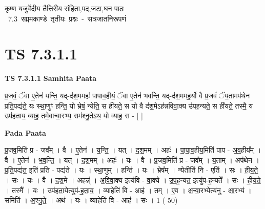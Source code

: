 \documentclass[17pt]{extarticle}
\begin{document}
\begin{titlepage}
    \begin{center}
 
\begin{sanskrit}
    { \Huge
    कृष्ण यजुर्वेदीय तैत्तिरीय संहिता,पद,जटा,घन पाठः 
    }
    \\
    \vspace{2.5cm}
    \mbox{ \Huge
    7.3      सप्तमकाण्डे तृतीयः प्रश्नः - सत्रजातनिरूपणं   }
\end{sanskrit}
\end{center}

\end{titlepage}
\tableofcontents
\pagebreak

\section*{ TS 7.3.1.1 }

\textbf{TS 7.3.1.1 } \newline
\textbf{Samhita Paata} \newline

प्र॒जवं॒ ॅवा ए॒तेन॑ यन्ति॒ यद्-द॑श॒ममहः॑ पापाव॒हीयं॒ ॅवा ए॒तेन॑ भवन्ति॒ यद्-द॑श॒ममह॒र्यो वै प्र॒जवं॑ ॅय॒तामप॑थेन प्रति॒पद्य॑ते॒ यः स्था॒णुꣳ हन्ति॒ यो भ्रेषं॒ न्येति॒ स ही॑यते॒ स यो वै द॑श॒मेऽह॑न्नविवा॒क्य उ॑पह॒न्यते॒ स ही॑यते॒ तस्मै॒ य उप॑हताय॒ व्याह॒ तमे॒वान्वा॒रभ्य॒ सम॑श्नु॒तेऽथ॒ यो व्याह॒ स - [  ] \newline

\textbf{Pada Paata} \newline

प्र॒जव॒मिति॑ प्र - जव᳚म् । वै । ए॒तेन॑ । य॒न्ति॒ । यत् । द॒श॒मम् । अहः॑ । पा॒पा॒व॒हीय॒मिति॑ पाप - अ॒व॒हीय᳚म् । वै । ए॒तेन॑ । भ॒व॒न्ति॒ । यत् । द॒श॒मम् । अहः॑ । यः । वै । प्र॒जव॒मिति॑ प्र - जव᳚म् । य॒ताम् । अप॑थेन । प्र॒ति॒पद्य॑त॒ इति॑ प्रति - पद्य॑ते । यः । स्था॒णुम् । हन्ति॑ । यः । भ्रेष᳚म् । न्येतीति॑ नि - एति॑ । सः । ही॒य॒ते॒ । सः । यः । वै । द॒श॒मे । अहन्न्॑ । अ॒वि॒वा॒क्य इत्य॑वि - वा॒क्ये । उ॒प॒ह॒न्यत॒ इत्यु॑प-ह॒न्यते᳚ । सः । ही॒य॒ते॒ । तस्मै᳚ । यः । उप॑हता॒येत्युप॑-ह॒ता॒य॒ । व्याहेति॑ वि - आह॑ । तम् । ए॒व । अ॒न्वा॒रभ्येत्य॑नु - आ॒रभ्य॑ । समिति॑ । अ॒श्नु॒ते॒ । अथ॑ । यः । व्याहेति॑ वि - आह॑ । सः । 1 ( 50)  \newline




\end{document}
